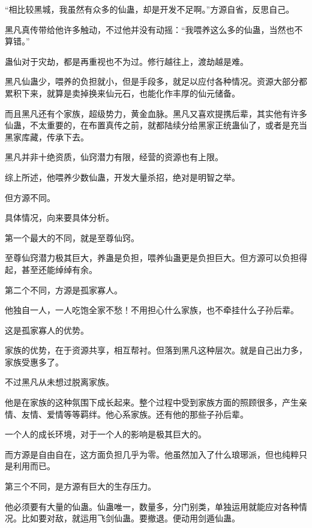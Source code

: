 
\begin{this_body}



“相比较黑城，我虽然有众多的仙蛊，却是开发不足啊。”方源自省，反思自己。

黑凡真传带给他许多触动，不过他并没有动摇：“我喂养这么多的仙蛊，当然也不算错。”

蛊仙对于灾劫，都是再重视也不为过。修行越往上，渡劫越是难。

黑凡仙蛊少，喂养的负担就小，但是手段多，就足以应付各种情况。资源大部分都累积下来，就算是卖掉换来仙元石，也能化作丰厚的仙元储备。

而且黑凡还有个家族，超级势力，黄金血脉。黑凡又喜欢提携后辈，其实他有许多仙蛊，不太重要的，在布置真传之前，就都陆续分给黑家正统蛊仙了，或者是充当黑家库藏，传承下去。

黑凡并非十绝资质，仙窍潜力有限，经营的资源也有上限。

综上所述，他喂养少数仙蛊，开发大量杀招，绝对是明智之举。

但方源不同。

具体情况，向来要具体分析。

第一个最大的不同，就是至尊仙窍。

至尊仙窍潜力极其巨大，养蛊是负担，喂养仙蛊更是负担巨大。但方源可以负担得起，甚至还能绰绰有余。

第二个不同，方源是孤家寡人。

他独自一人，一人吃饱全家不愁！不用担心什么家族，也不牵挂什么子孙后辈。

这是孤家寡人的优势。

家族的优势，在于资源共享，相互帮衬。但落到黑凡这种层次。就是自己出力多，家族受惠多了。

不过黑凡从未想过脱离家族。

他是在家族的这种氛围下成长起来。整个过程中受到家族方面的照顾很多，产生亲情、友情、爱情等等羁绊。他心系家族。还有他的那些子孙后辈。

一个人的成长环境，对于一个人的影响是极其巨大的。

而方源是自由自在，这方面负担几乎为零。他虽然加入了什么琅琊派，但也纯粹只是利用而已。

第三个不同，是方源有巨大的生存压力。

他必须要有大量的仙蛊。仙蛊唯一，数量多，分门别类，单独运用就能应对各种情况。比如要对敌，就运用飞剑仙蛊。要撤退。便动用剑遁仙蛊。


\end{this_body}
